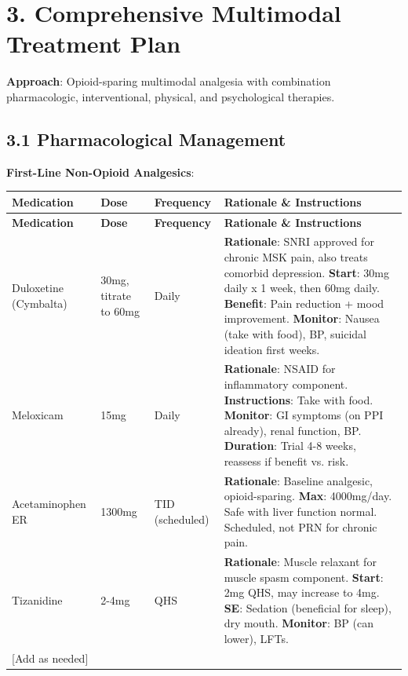 \documentclass[11pt,letterpaper]{article}
\begin{document}
\section*{3. Comprehensive Multimodal Treatment Plan}

\textbf{Approach}: Opioid-sparing multimodal analgesia with combination pharmacologic, interventional, physical, and psychological therapies.

\subsection*{3.1 Pharmacological Management}

\textbf{First-Line Non-Opioid Analgesics}:

\begin{longtable}{|p{3cm}|p{2cm}|p{2cm}|p{6.5cm}|}
\hline
\textbf{Medication} & \textbf{Dose} & \textbf{Frequency} & \textbf{Rationale \& Instructions} \\ \hline
\endfirsthead
\hline
\textbf{Medication} & \textbf{Dose} & \textbf{Frequency} & \textbf{Rationale \& Instructions} \\ \hline
\endhead

Duloxetine (Cymbalta) & 30mg, titrate to 60mg & Daily & \textbf{Rationale}: SNRI approved for chronic MSK pain, also treats comorbid depression. \textbf{Start}: 30mg daily x 1 week, then 60mg daily. \textbf{Benefit}: Pain reduction + mood improvement. \textbf{Monitor}: Nausea (take with food), BP, suicidal ideation first weeks. \\ \hline

Meloxicam & 15mg & Daily & \textbf{Rationale}: NSAID for inflammatory component. \textbf{Instructions}: Take with food. \textbf{Monitor}: GI symptoms (on PPI already), renal function, BP. \textbf{Duration}: Trial 4-8 weeks, reassess if benefit vs. risk. \\ \hline

Acetaminophen ER & 1300mg & TID (scheduled) & \textbf{Rationale}: Baseline analgesic, opioid-sparing. \textbf{Max}: 4000mg/day. Safe with liver function normal. Scheduled, not PRN for chronic pain. \\ \hline

Tizanidine & 2-4mg & QHS & \textbf{Rationale}: Muscle relaxant for muscle spasm component. \textbf{Start}: 2mg QHS, may increase to 4mg. \textbf{SE}: Sedation (beneficial for sleep), dry mouth. \textbf{Monitor}: BP (can lower), LFTs. \\ \hline

[Add as needed] & & & \\ \hline
\end{longtable}
\end{document}
